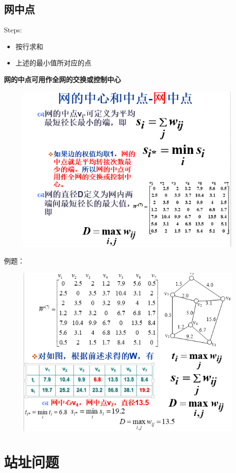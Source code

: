 \subsection{网中点}
Steps:
\begin{itemize}
	\item 按行求和
	\item 上述的最小值所对应的点
\end{itemize}
\textbf{网的中点可用作全网的交换或控制中心}
\begin{figure}[H]
	\centering
	\includegraphics[width=0.7\linewidth]{figures/screenshot075}
	\caption{}
	\label{fig:screenshot075}
\end{figure}
例题：
\begin{figure}[H]
	\centering
	\includegraphics[width=0.7\linewidth]{figures/screenshot076}
	\caption{}
	\label{fig:screenshot076}
\end{figure}
\section{站址问题}
